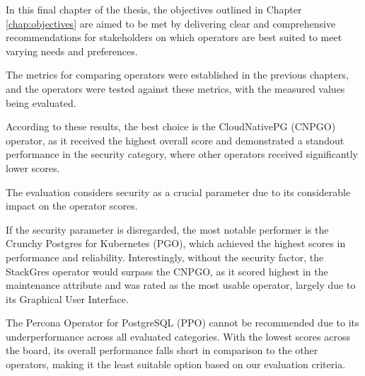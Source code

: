 
In this final chapter of the thesis, the objectives outlined in Chapter \ref{chap:objectives} are aimed to be met by delivering clear and comprehensive recommendations for stakeholders on which operators are best suited to meet varying needs and preferences.

The metrics for comparing operators were established in the previous chapters, and the operators were tested against these metrics, with the measured values being evaluated.

According to these results, the best choice is the CloudNativePG (CNPGO) operator, as it received the highest overall score and demonstrated a standout performance in the security category, where other operators received significantly lower scores.

The evaluation considers security as a crucial parameter due to its considerable impact on the operator scores.

If the security parameter is disregarded, the most notable performer is the Crunchy Postgres for Kubernetes (PGO), which achieved the highest scores in performance and reliability. Interestingly, without the security factor, the StackGres operator would surpass the CNPGO, as it scored highest in the maintenance attribute and was rated as the most usable operator, largely due to its Graphical User Interface.

The Percona Operator for PostgreSQL (PPO) cannot be recommended due to its underperformance across all evaluated categories. With the lowest scores across the board, its overall performance falls short in comparison to the other operators, making it the least suitable option based on our evaluation criteria.






